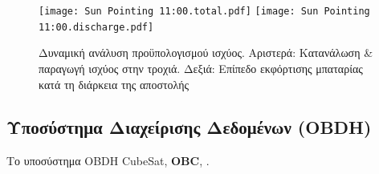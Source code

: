 \documentclass[a4paper,nobib]{tufte-book}
\begin{document}
\FloatBarrier

\begin{figure}[h]
	\texttt{[image: Sun Pointing 11:00.total.pdf]}
	\hfill
	\texttt{[image: Sun Pointing 11:00.discharge.pdf]}

	\caption[Δυναμική ανάλυση προϋπολογισμού ισχύος]{Δυναμική ανάλυση προϋπολογισμού ισχύος. Αριστερά: Κατανάλωση \& παραγωγή ισχύος στην τροχιά. Δεξιά: Επίπεδο εκφόρτισης μπαταρίας κατά τη διάρκεια της αποστολής}
\end{figure}

\subsection{Υποσύστημα Διαχείρισης Δεδομένων (\acs{OBDH})}
\label{sec:obdh}

Το υποσύστημα \ac{OBDH}  CubeSat,  \textbf{\acf{OBC}},  \autocite{DDJF_OBDH}.
\end{document}
